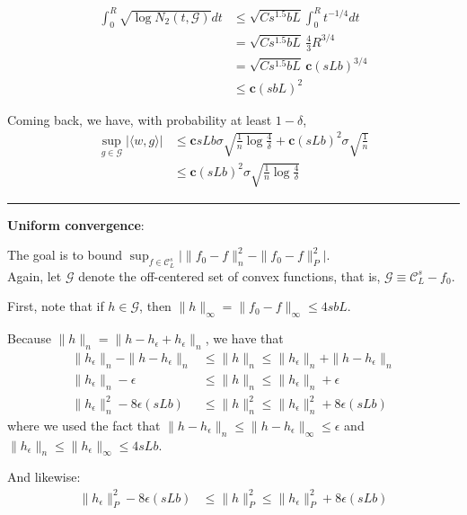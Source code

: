 \documentclass{article}
\begin{document}
{\begin{align*}
\int_0^R \sqrt{\log N_2(t, \mathcal{G})} dt &\leq 
      \sqrt{C s^{1.5} b L} \int_0^R t^{-1/4} dt \\ 
 &= \sqrt{C s^{1.5} b L} \, \frac{4}{3} R^{3/4} \\
 &= \sqrt{C s^{1.5} b L} \, \mathbf{c} (sLb)^{3/4} \\
 &\leq \mathbf{c} (s b L)^2
\end{align*}

Coming back, we have, with probability at least $1-\delta$,
\begin{align*}
\sup_{g \in \mathcal{G}} | \langle w, g \rangle | &\leq 
    \mathbf{c} sLb \sigma \sqrt{ \frac{1}{n} \log \frac{4}{\delta} } + 
    \mathbf{c} (sLb)^2 \sigma \sqrt{ \frac{1}{n} } \\
 &\leq \mathbf{c} (sLb)^2\sigma \sqrt{ \frac{1}{n} \log \frac{4}{\delta} }
\end{align*}

\rule{5cm}{0.4pt}
\vspace{0.2in}

\textbf{Uniform convergence}:

The goal is to bound 
$\sup_{f \in \mathcal{C}^s_L} \Big| \| f_0 - f \|^2_n - \|f_0 - f \|^2_P\Big|$. \\

Again, let $\mathcal{G}$ denote the off-centered set of convex functions, that is, $\mathcal{G} \equiv \mathcal{C}^s_L - f_0$. 

First, note that if $h \in \mathcal{G}$, then $\| h \|_\infty = \| f_0 - f \|_\infty \leq 4 s b L$.

Because $\| h \|_n = \| h - h_\epsilon + h_\epsilon \|_n$, we have that
\begin{align*}
\|h_\epsilon \|_n - \| h - h_\epsilon \|_n &\leq 
    \| h \|_n \leq \|h_\epsilon \|_n + \| h - h_\epsilon \|_n \\
\|h_\epsilon \|_n - \epsilon &\leq 
    \| h \|_n \leq \|h_\epsilon \|_n + \epsilon  \\
\| h_\epsilon \|^2_n - 8 \epsilon (s L b)  &\leq \| h  \|^2_n  \leq
   \| h_\epsilon \|_n^2 + 8 \epsilon (s L b) 
\end{align*}
where we used the fact that $\| h - h_\epsilon \|_n \leq \| h - h_\epsilon \|_\infty \leq \epsilon$ and $ \| h_\epsilon \|_n \leq \| h_\epsilon \|_\infty \leq 4 s L b$.


And likewise:
\begin{align*}
\| h_\epsilon \|^2_P - 8 \epsilon (s L b)  &\leq \| h  \|^2_P \leq
   \| h_\epsilon \|_P^2 + 8 \epsilon (s L b)
\end{align*} 

}
\end{document}
